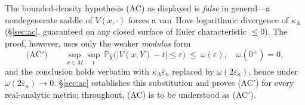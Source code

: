 \begin{remark}\label{rem:ac-super}
The bounded-density hypothesis (AC) as displayed is \emph{false} in general---a nondegenerate
saddle of $V(x,\cdot)$ forces a van~Hove logarithmic divergence of $\kappa_\Lambda$
(\S\ref{sec:ac}, guaranteed on any closed surface of Euler characteristic $\le0$). The
proof, however, uses only the weaker \emph{modulus} form
\[
\text{(AC$'$)}\qquad
\sup_{x\in M}\sup_{t}\ \mathbb P_Y\bigl(\lvert V(x,Y)-t\rvert\le\varepsilon\bigr)\ \le\ \omega(\varepsilon),
\quad \omega(0^+)=0,
\]
and the conclusion holds verbatim with $\kappa_\Lambda\bar\varepsilon_n$ replaced by
$\omega(2\bar\varepsilon_n)$, hence under $\omega(2\bar\varepsilon_n)\to0$. \S\ref{sec:ac}
establishes this substitution and proves (AC$'$) for every real-analytic metric; throughout,
(AC) is to be understood as (AC$'$).
\end{remark}

